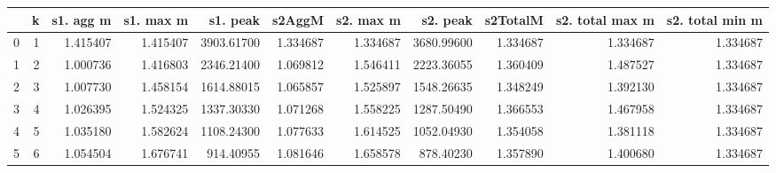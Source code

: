 \begin{tabular}{lrrrrrrrrrr}
\toprule
{} &  k &  s1. agg m &  s1. max m &    s1. peak &    s2AggM &  s2. max m &    s2. peak &  s2TotalM &  s2. total max m &  s2. total min m \\
\midrule
0 &  1 &   1.415407 &   1.415407 &  3903.61700 &  1.334687 &   1.334687 &  3680.99600 &  1.334687 &         1.334687 &         1.334687 \\
1 &  2 &   1.000736 &   1.416803 &  2346.21400 &  1.069812 &   1.546411 &  2223.36055 &  1.360409 &         1.487527 &         1.334687 \\
2 &  3 &   1.007730 &   1.458154 &  1614.88015 &  1.065857 &   1.525897 &  1548.26635 &  1.348249 &         1.392130 &         1.334687 \\
3 &  4 &   1.026395 &   1.524325 &  1337.30330 &  1.071268 &   1.558225 &  1287.50490 &  1.366553 &         1.467958 &         1.334687 \\
4 &  5 &   1.035180 &   1.582624 &  1108.24300 &  1.077633 &   1.614525 &  1052.04930 &  1.354058 &         1.381118 &         1.334687 \\
5 &  6 &   1.054504 &   1.676741 &   914.40955 &  1.081646 &   1.658578 &   878.40230 &  1.357890 &         1.400680 &         1.334687 \\
\bottomrule
\end{tabular}
